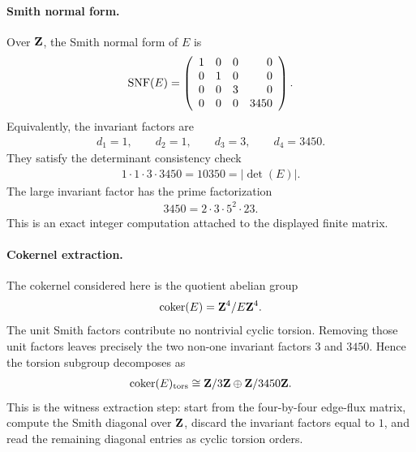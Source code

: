 \paragraph{Smith normal form.}
Over ${\bf Z}$, the Smith normal form of $E$ is
$$
\begin{aligned}
{\rm SNF}(E)=
\left(\begin{array}{rrrr}
1&0&0&0\\
0&1&0&0\\
0&0&3&0\\
0&0&0&3450
\end{array}\right).
\end{aligned}
$$
Equivalently, the invariant factors are
$$
\begin{aligned}
d_1=1,\qquad d_2=1,\qquad d_3=3,\qquad d_4=3450.
\end{aligned}
$$
They satisfy the determinant consistency check
$$
\begin{aligned}
1\cdot 1\cdot 3\cdot 3450=10350=|\det(E)|.
\end{aligned}
$$
The large invariant factor has the prime factorization
$$
\begin{aligned}
3450=2\cdot 3\cdot 5^2\cdot 23.
\end{aligned}
$$
This is an exact integer computation attached to the displayed finite matrix.

\paragraph{Cokernel extraction.}
The cokernel considered here is the quotient abelian group
$$
\begin{aligned}
{\rm coker}(E)={\bf Z}^4/E{\bf Z}^4.
\end{aligned}
$$
The unit Smith factors contribute no nontrivial cyclic torsion.  Removing those unit factors leaves precisely the two non-one invariant factors $3$ and $3450$.  Hence the torsion subgroup decomposes as
$$
\begin{aligned}
{\rm coker}(E)_{\rm tors}\cong {\bf Z}/3{\bf Z}\oplus {\bf Z}/3450{\bf Z}.
\end{aligned}
$$
This is the witness extraction step: start from the four-by-four edge-flux matrix, compute the Smith diagonal over ${\bf Z}$, discard the invariant factors equal to $1$, and read the remaining diagonal entries as cyclic torsion orders.

